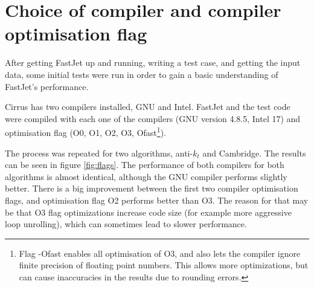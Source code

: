 \section{Choice of compiler and compiler optimisation flag}

After getting FastJet up and running, writing a test case, and getting the input data, some initial tests were run in order to gain a basic understanding of FastJet's performance.

Cirrus has two compilers installed, GNU and Intel. FastJet and the test code were compiled with each one of the compilers (GNU version  4.8.5, Intel 17) and optimisation flag (O0, O1, O2, O3, Ofast\footnote{Flag -Ofast enables all optimisation of O3, and also lets the compiler ignore finite precision of floating point numbers. This allows more optimizations, but can cause inaccuracies in the results due to rounding errors.}).

The process was repeated for two algorithms, anti-$k_t$ and Cambridge. The results can be seen in figure \ref{fig:flags}. The performance of both compilers for both algorithms is almost identical, although the GNU compiler performs slightly better. There is a big improvement between the first two compiler optimisation flags, and optimisation flag O2 performs better than O3. The reason for that may be that O3 flag optimizations increase code size (for example more aggressive loop unrolling), which can sometimes lead to slower performance. 


